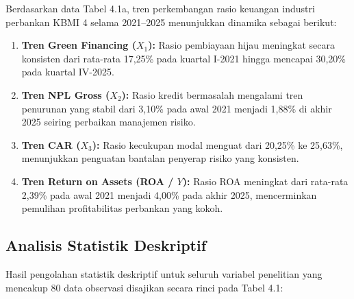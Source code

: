 \documentclass[12pt,a4paper]{article}
\numberwithin{equation}{section}
\begin{document}
\noindent
Berdasarkan data Tabel 4.1a, tren perkembangan rasio keuangan industri perbankan KBMI 4 selama 2021--2025 menunjukkan dinamika sebagai berikut:
\begin{enumerate}
  \item \textbf{Tren Green Financing ($X_1$):} Rasio pembiayaan hijau meningkat secara konsisten dari rata-rata 17,25\% pada kuartal I-2021 hingga mencapai 30,20\% pada kuartal IV-2025.
  \item \textbf{Tren NPL Gross ($X_2$):} Rasio kredit bermasalah mengalami tren penurunan yang stabil dari 3,10\% pada awal 2021 menjadi 1,88\% di akhir 2025 seiring perbaikan manajemen risiko.
  \item \textbf{Tren CAR ($X_3$):} Rasio kecukupan modal menguat dari 20,25\% ke 25,63\%, menunjukkan penguatan bantalan penyerap risiko yang konsisten.
  \item \textbf{Tren Return on Assets (ROA / $Y$):} Rasio ROA meningkat dari rata-rata 2,39\% pada awal 2021 menjadi 4,00\% pada akhir 2025, mencerminkan pemulihan profitabilitas perbankan yang kokoh.
\end{enumerate}

\subsection{Analisis Statistik Deskriptif}

\noindent
Hasil pengolahan statistik deskriptif untuk seluruh variabel penelitian yang mencakup 80 data observasi disajikan secara rinci pada Tabel 4.1:
\end{document}
